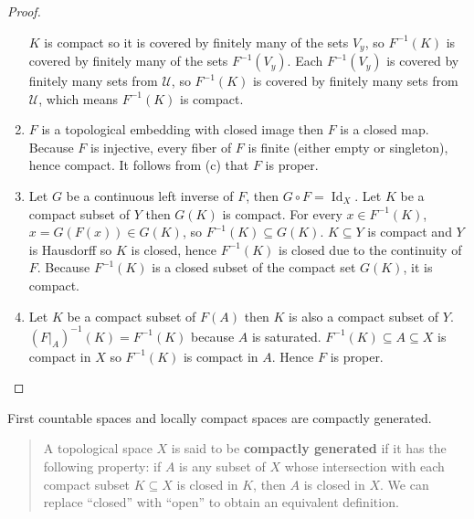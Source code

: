 \begin{proof}
\begin{enumerate}[label={(\alph*)}]
		      $K$ is compact so it is covered by finitely many of the sets $V_{y}$, so $F^{-1}(K)$ is covered by finitely many of the sets $F^{-1}(V_{y})$. Each $F^{-1}(V_{y})$ is covered by finitely many sets from $\mathscr{U}$, so $F^{-1}(K)$ is covered by finitely many sets from $\mathscr{U}$, which means $F^{-1}(K)$ is compact.
		\item $F$ is a topological embedding with closed image then $F$ is a closed map. Because $F$ is injective, every fiber of $F$ is finite (either empty or singleton), hence compact. It follows from (c) that $F$ is proper.
		\item Let $G$ be a continuous left inverse of $F$, then $G\circ F = \operatorname{Id}_{X}$. Let $K$ be a compact subset of $Y$ then $G(K)$ is compact. For every $x\in F^{-1}(K)$, $x = G(F(x)) \in G(K)$, so $F^{-1}(K) \subseteq G(K)$. $K\subseteq Y$ is compact and $Y$ is Hausdorff so $K$ is closed, hence $F^{-1}(K)$ is closed due to the continuity of $F$. Because $F^{-1}(K)$ is a closed subset of the compact set $G(K)$, it is compact.
		\item Let $K$ be a compact subset of $F(A)$ then $K$ is also a compact subset of $Y$. ${(F\vert_{A})}^{-1}(K) = F^{-1}(K)$ because $A$ is saturated. $F^{-1}(K) \subseteq A \subseteq X$ is compact in $X$ so $F^{-1}(K)$ is compact in $A$. Hence $F$ is proper.
	\end{enumerate}
\end{proof}

\begin{lemma}{4.94}
	First countable spaces and locally compact spaces are compactly generated.
\end{lemma}

\begin{quote}
	A topological space $X$ is said to be \textbf{compactly generated} if it has the following property: if $A$ is any subset of $X$ whose intersection with each compact subset $K\subseteq X$ is closed in $K$, then $A$ is closed in $X$. We can replace ``closed'' with ``open'' to obtain an equivalent definition.
\end{quote}

